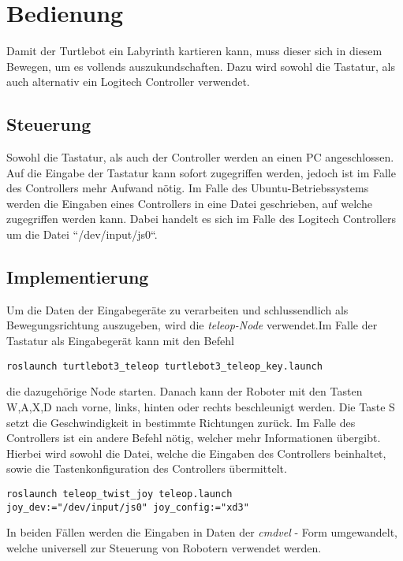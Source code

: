 \section{Bedienung}
{
	Damit der Turtlebot ein Labyrinth kartieren kann, muss dieser sich in diesem Bewegen, um es vollends auszukundschaften. Dazu wird sowohl die Tastatur, als auch alternativ ein Logitech Controller verwendet.
	
	\subsection{Steuerung}
	{
		Sowohl die Tastatur, als auch der Controller werden an einen PC angeschlossen. Auf die Eingabe der Tastatur kann sofort zugegriffen werden, jedoch ist im Falle des Controllers mehr Aufwand nötig. Im Falle des Ubuntu-Betriebssystems werden die Eingaben eines Controllers in eine Datei geschrieben, auf welche zugegriffen werden kann. Dabei handelt es sich im Falle des Logitech Controllers um die Datei ``/dev/input/js0``.
	}

	\subsection{Implementierung}
	{ Um die Daten der Eingabegeräte zu verarbeiten und schlussendlich als Bewegungsrichtung auszugeben, wird die \textit{teleop-Node} verwendet.Im Falle der Tastatur als Eingabegerät kann mit den Befehl 
		\begin{lstlisting}
roslaunch turtlebot3_teleop turtlebot3_teleop_key.launch
		\end{lstlisting}
	die dazugehörige Node starten. Danach kann der Roboter mit den Tasten W,A,X,D nach vorne, links,  hinten oder rechts beschleunigt werden. Die Taste S setzt die Geschwindigkeit in bestimmte Richtungen zurück.
	\newline
	Im Falle des Controllers ist ein andere Befehl nötig, welcher mehr Informationen übergibt. Hierbei wird sowohl die Datei, welche die Eingaben des Controllers beinhaltet, sowie die Tastenkonfiguration des Controllers übermittelt.
	\begin{lstlisting}
roslaunch teleop_twist_joy teleop.launch 
joy_dev:="/dev/input/js0" joy_config:="xd3"
	\end{lstlisting}
	
	In beiden Fällen werden die Eingaben in Daten der \textit{cmd\textunderscore vel} - Form umgewandelt, welche universell zur Steuerung von Robotern verwendet werden.
	}
}